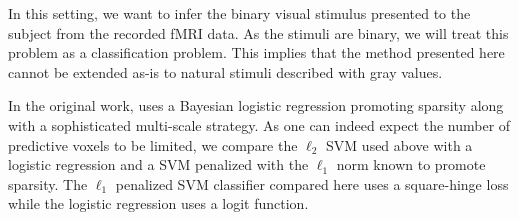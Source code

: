 \documentclass{frontiersSCNS} %
\begin{document}
In this setting, we want to infer the binary visual stimulus presented to
the subject from the recorded fMRI data.
As the stimuli are binary, we will treat this problem as a classification
problem. This implies that the method presented here cannot be extended as-is to
natural stimuli described with gray values. 

In the original work, \cite{miyawaki2008} uses a Bayesian logistic regression
promoting sparsity along with a sophisticated multi-scale strategy.
As one can indeed expect the number of predictive voxels to be limited, we 
compare the $\ell_2$ SVM used above with
a logistic regression and a SVM
penalized with the $\ell_1$ norm
known to promote sparsity. The $\ell_1$ penalized SVM classifier compared here
uses a square-hinge loss while the logistic regression uses a logit function.

\end{document}

